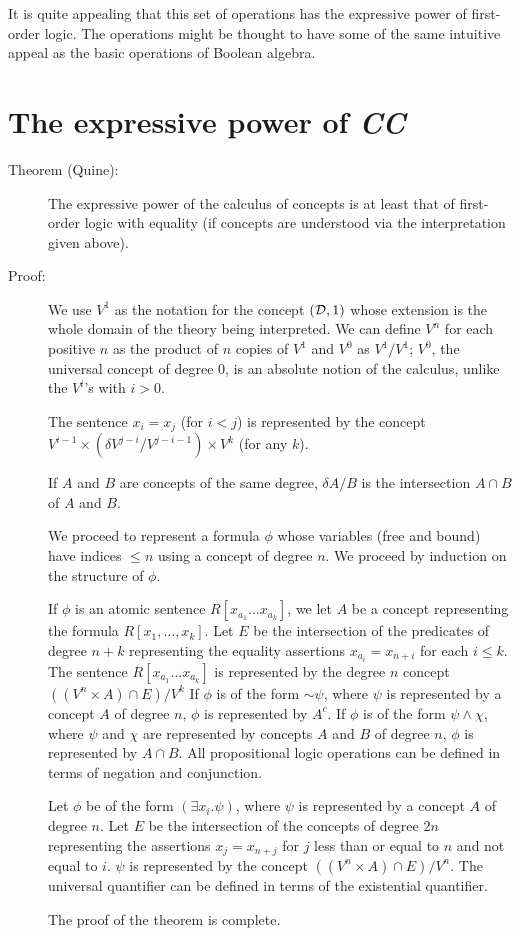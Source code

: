 \documentclass{article}
\begin{document}
It is quite appealing that this set of operations has the expressive
power of first-order logic.  The operations might be thought to have
some of the same intuitive appeal as the basic operations of Boolean
algebra.

\section{The expressive power of {\em CC\/}}
\begin{description}

\item[Theorem (Quine):] The expressive power of the calculus of
concepts is at least that of first-order logic with equality (if
concepts are understood via the interpretation given above).

\item[Proof:]  We use $V^1$ as the notation for the concept $({\cal D},1)$ 
whose extension is the whole domain of the theory being interpreted.
We can define $V^n$ for each positive $n$ as the product of $n$ copies
of $V^1$ and $V^0$ as $V^1/V^1$; $V^0$, the universal concept of
degree 0, is an absolute notion of the calculus, unlike the $V^i$'s
with $i>0$.

The sentence $x_i = x_j$ (for $i < j$) is represented by the concept
$V^{i-1}\times (\delta V^{j-i} / V^{j-i-1})\times V^k$ (for any $k$).

If $A$ and $B$ are concepts of the same degree, $\delta A / B$ is the
intersection $A \cap B$ of $A$ and $B$.

We proceed to represent a formula $\phi$ whose variables (free and
bound) have indices $\leq n$ using a concept of degree $n$.  We
proceed by induction on the structure of $\phi$.

If $\phi$ is an atomic sentence $R[x_{a_1}\ldots x_{a_k}]$, we let $A$
be a concept representing the formula $R[x_1,\ldots,x_k]$.  Let $E$ be the
intersection of the predicates of degree $n+k$ representing the
equality assertions $x_{a_i}=x_{n+i}$ for each $i \leq k$.  The
sentence $R[x_{a_1}\ldots x_{a_k}]$ is represented by the degree $n$
concept $((V^n \times A) \cap E)/V^{k}$
If $\phi$ is of the form $\sim\psi$, where $\psi$ is represented by a
concept $A$ of degree $n$, $\phi$ is represented by $A^c$.  If $\phi$
is of the form $\psi \wedge \chi$, where $\psi$ and $\chi$ are
represented by concepts $A$ and $B$ of degree $n$, $\phi$ is
represented by $A \cap B$.  All propositional logic operations can be
defined in terms of negation and conjunction.

Let $\phi$ be of the form $(\exists x_i.\psi)$, where $\psi$ is
represented by a concept $A$ of degree $n$.  Let $E$ be the
intersection of the concepts of degree $2n$ representing the assertions
$x_j = x_{n+j}$ for $j$ less than or equal to $n$ and not equal to
$i$.  $\psi$ is represented by the concept $((V^n\times A)\cap E)/V^n$.
The universal quantifier can be defined in terms of the existential
quantifier.

The proof of the theorem is complete.

\end{description}
\end{document}
